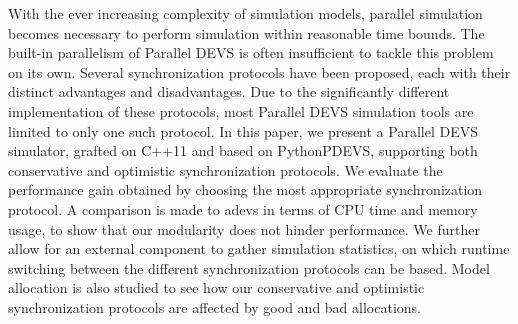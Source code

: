 With the ever increasing complexity of simulation models, parallel simulation becomes necessary to perform simulation within reasonable time bounds.
The built-in parallelism of Parallel DEVS is often insufficient to tackle this problem on its own.
Several synchronization protocols have been proposed, each with their distinct advantages and disadvantages.
Due to the significantly different implementation of these protocols, most Parallel DEVS simulation tools are limited to only one such protocol.
In this paper, we present a Parallel DEVS simulator, grafted on C++11 and based on PythonPDEVS, supporting both conservative and optimistic synchronization protocols.
We evaluate the performance gain obtained by choosing the most appropriate synchronization protocol.
A comparison is made to adevs in terms of CPU time and memory usage, to show that our modularity does not hinder performance.
We further allow for an external component to gather simulation statistics, on which runtime switching between the different synchronization protocols can be based.
Model allocation is also studied to see how our conservative and optimistic synchronization protocols are affected by good and bad allocations.

